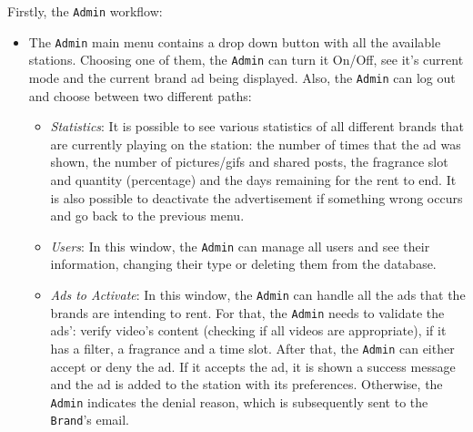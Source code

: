 Firstly, the \texttt{Admin} workflow:
%
\begin{itemize}
\item The \texttt{Admin} main menu contains a drop down button with all the
  available stations. Choosing one of them, the \texttt{Admin} can turn it On/Off, see it's current mode and the current brand ad being displayed. Also, the \texttt{Admin} can log out and choose between two different paths:
%
\begin{itemize}
\item \emph{Statistics}: It is possible to see various statistics of all different brands that are currently playing on the station: the number of times that the ad was shown, the number of pictures/\gls{gif}s and shared posts, the fragrance slot and quantity (percentage) and the days remaining for the rent to end.
It is also possible to deactivate the advertisement if something wrong occurs and go back to the previous menu.
\item \emph{Users}: In this window, the \texttt{Admin} can manage all users and see their
  information, changing their type or deleting them from the database.
\item \emph{Ads to Activate}: In this window, the \texttt{Admin} can handle all the ads that the brands are intending to rent.
For that, the \texttt{Admin} needs to validate the ads': verify video's content (checking if
all videos are appropriate), if it has a filter, a fragrance and a time slot.
After that, the \texttt{Admin} can either accept or deny the ad.
If it accepts the ad, it is shown a success message and the ad is added to the station with its preferences.
Otherwise, the \texttt{Admin} indicates the denial reason, which is subsequently sent to the \texttt{Brand}'s email.
\end{itemize}
%
\end{itemize}

